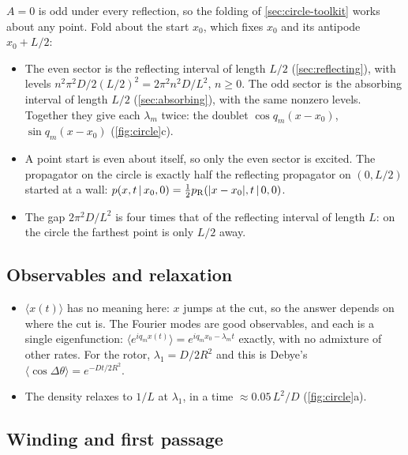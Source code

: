 \documentclass[11pt]{article}
\numberwithin{equation}{section}
\newcommand{\avg}[1]{\langle #1\rangle}
\newcommand{\given}{\,|\,}
\begin{document}
$A=0$ is odd under every reflection, so the folding of \cref{sec:circle-toolkit} works about any point. Fold
about the start $x_0$, which fixes $x_0$ and its antipode $x_0+L/2$:
\begin{itemize}
  \item The even sector is the reflecting interval of length $L/2$ (\cref{sec:reflecting}), with levels
        $n^2\pi^2D/2(L/2)^2=2\pi^2n^2D/L^2$, $n\ge0$. The odd sector is the absorbing interval of length $L/2$
        (\cref{sec:absorbing}), with the same nonzero levels. Together they give each $\lambda_m$ twice: the
        doublet $\cos q_m(x-x_0)$, $\sin q_m(x-x_0)$ (\cref{fig:circle}c).
  \item A point start is even about itself, so only the even sector is excited. The propagator on the circle
        is exactly half the reflecting propagator on $(0,L/2)$ started at a wall:
        $p(x,t\given x_0,0)=\tfrac12p_{\rm R}(|x-x_0|,t\given0,0)$.
  \item The gap $2\pi^2D/L^2$ is four times that of the reflecting interval of length $L$: on the circle the
        farthest point is only $L/2$ away.
\end{itemize}

\subsection{Observables and relaxation}

\begin{itemize}
  \item $\avg{x(t)}$ has no meaning here: $x$ jumps at the cut, so the answer depends on where the cut is.
        The Fourier modes are good observables, and each is a single eigenfunction:
        $\avg{e^{iq_mx(t)}}=e^{iq_mx_0-\lambda_mt}$ exactly, with no admixture of other rates. For the rotor,
        $\lambda_1=D/2R^2$ and this is Debye's $\avg{\cos\Delta\theta}=e^{-Dt/2R^2}$.
  \item The density relaxes to $1/L$ at $\lambda_1$, in a time $\approx0.05\,L^2/D$ (\cref{fig:circle}a).
\end{itemize}

\subsection{Winding and first passage}
\end{document}
